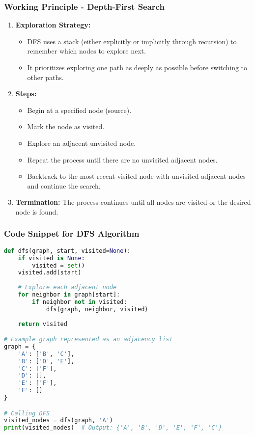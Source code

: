 \documentclass[aspectratio=169]{beamer}
\begin{document}
\begin{frame}
    \frametitle{Working Principle - Depth-First Search}
    \begin{enumerate}
        \item \textbf{Exploration Strategy:}
        \begin{itemize}
            \item DFS uses a stack (either explicitly or implicitly through recursion) to remember which nodes to explore next.
            \item It prioritizes exploring one path as deeply as possible before switching to other paths.
        \end{itemize}
        
        \item \textbf{Steps:}
        \begin{itemize}
            \item Begin at a specified node (source).
            \item Mark the node as visited.
            \item Explore an adjacent unvisited node.
            \item Repeat the process until there are no unvisited adjacent nodes.
            \item Backtrack to the most recent visited node with unvisited adjacent nodes and continue the search.
        \end{itemize}
        
        \item \textbf{Termination:} The process continues until all nodes are visited or the desired node is found.
    \end{enumerate}
\end{frame}

\begin{frame}[fragile]
    \frametitle{Code Snippet for DFS Algorithm}
    \begin{lstlisting}[language=Python]
def dfs(graph, start, visited=None):
    if visited is None:
        visited = set()
    visited.add(start)
    
    # Explore each adjacent node
    for neighbor in graph[start]:
        if neighbor not in visited:
            dfs(graph, neighbor, visited)
    
    return visited

# Example graph represented as an adjacency list
graph = {
    'A': ['B', 'C'],
    'B': ['D', 'E'],
    'C': ['F'],
    'D': [],
    'E': ['F'],
    'F': []
}

# Calling DFS
visited_nodes = dfs(graph, 'A')
print(visited_nodes)  # Output: {'A', 'B', 'D', 'E', 'F', 'C'}
    \end{lstlisting}
\end{frame}
\end{document}
